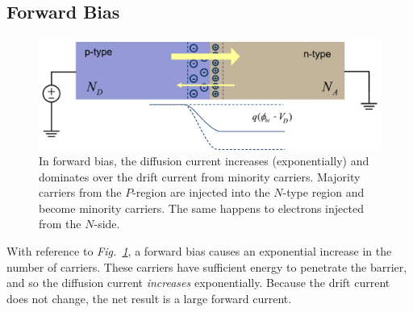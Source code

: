 \subsection{Forward Bias}
\begin{figure}[t]
\centering
\includegraphics[width=.95\columnwidth]{slide36b}
\caption{In forward bias, the diffusion current increases (exponentially) and dominates over the drift current from minority carriers.  Majority carriers from the $P$-region are injected into the $N$-type region and become minority carriers. The same happens to electrons injected from the $N$-side.}
\label{fig:slide36b}
\end{figure}
With reference to \emph{Fig.~\ref{fig:slide36b}}, a forward bias causes an exponential increase in the number of carriers.  These carriers have sufficient energy to penetrate the barrier, and so the diffusion current \textit{increases} exponentially.  Because the drift current does not change, the net result is a large forward current.
